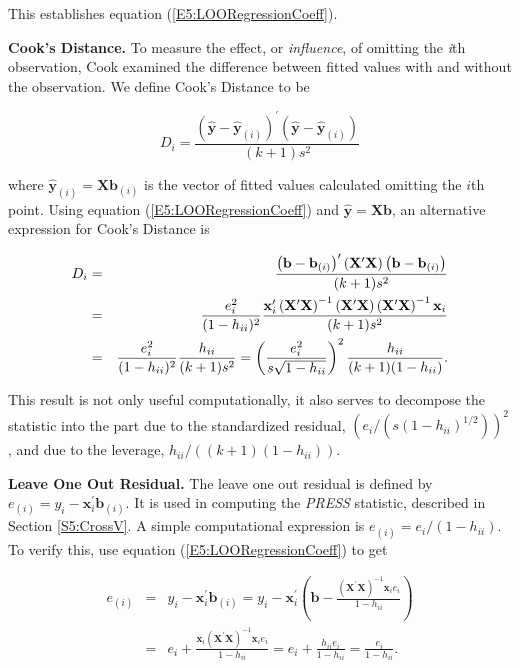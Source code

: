 \noindent This establishes equation (\ref{E5:LOORegressionCoeff}).

\textbf{Cook's Distance.} To measure the effect, or
\textit{influence}, of omitting the \textit{i}th observation, Cook
examined the difference between fitted values with and without the
observation. We define Cook's Distance to be
\begin{center}
\[
D_i=\frac{\left( \mathbf{\hat{y}-\hat{y}}_{(i)}\right)
^{\prime}\left( \mathbf{\hat{y}-\hat{y}}_{(i)}\right) }{(k+1)s^2}
\]
\end{center}
where $\mathbf{\hat{y}}_{(i)}=\mathbf{Xb}_{(i)}$ is the vector of
fitted values calculated omitting the $i$th point. Using equation
(\ref{E5:LOORegressionCoeff}) and $\mathbf{\hat{y}}=\mathbf{Xb}$, an
alternative expression for Cook's Distance is
\begin{center}
\begin{eqnarray*}
D_i &=&\frac{\left( \mathbf{b-b}_{(i)}\right) ^{\prime}\left( \mathbf{X}%
^{\prime}\mathbf{X}\right) \left( \mathbf{b-b}_{(i)}\right) }{(k+1)s^2} \\
&=&\frac{e_i^2}{(1-h_{ii})^2}\frac{\mathbf{x}_i^{\prime}\left(
\mathbf{X}^{\prime}\mathbf{X}\right) ^{-1} \left(
\mathbf{X}^{\prime}\mathbf{X}\right) \left(
\mathbf{X}^{\prime}\mathbf{X}\right) ^{-1}\mathbf{x}_i}{(k+1)s^2} \\
&=&\frac{e_i^2}{(1-h_{ii})^2}\frac{h_{ii}}{(k+1)s^2}=\left(
\frac{e_i^2}{s\sqrt{1-h_{ii}}}\right) ^2\frac{h_{ii}}{%
(k+1)(1-h_{ii})}.
\end{eqnarray*}
\end{center}
This result is not only useful computationally, it also serves to
decompose
the statistic into the part due to the standardized residual, $\left( e%
_i/\left( s\left( 1-h_{ii}\right) ^{1/2}\right) \right) ^2$, and due
to the leverage, $h_{ii}/\left( \left( k+1\right) \left(
1-h_{ii}\right) \right) $.


\textbf{Leave One Out Residual.} The leave one out residual is defined by $%
e_{(i)}=y_i-\mathbf{x}_i^{\prime}\mathbf{b}_{(i)}$. It is used in
computing the \textit{PRESS} statistic, described in Section
\ref{S5:CrossV}. A simple computational expression is
$e_{(i)}=e_i/(1-h_{ii})$. To verify this, use equation
(\ref{E5:LOORegressionCoeff}) to get
\begin{center}
\begin{eqnarray*}
e_{(i)} &=&y_i-\mathbf{x}_i^{\prime}\mathbf{b}_{(i)}=y_i-%
\mathbf{x}_i^{\prime}\left( \mathbf{b}-\frac{\left( \mathbf{X}^{\prime}%
\mathbf{X}\right) ^{-1}\mathbf{x}_ie_i}{1-h_{ii}}\right)  \\
&=&e_i+\frac{\mathbf{x}_i\left( \mathbf{X}^{\prime}\mathbf{X}%
\right) ^{-1}\mathbf{x}_ie_i}{1-h_{ii}}=e_i+\frac{h_{ii}
e_i}{1-h_{ii}}=\frac{e_i}{1-h_{ii}}.
\end{eqnarray*}
\end{center}

